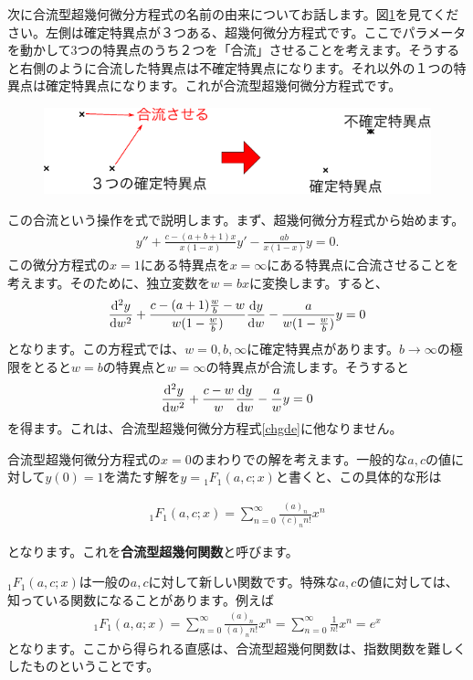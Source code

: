 \documentclass[report,paper=a4, fontsize=12pt, line_length=16cm, number_of_lines=33,dvipdfmx]{jlreq}
\newenvironment{important}{\begin{tcolorbox}[
  colback = white,
  colframe = red!35,
  boxrule = 2mm,
  fonttitle = \bfseries,
  after = \noindent] }{\end{tcolorbox}}
\numberwithin{equation}{section}
\newcommand{\strong}[1]{\textsf{\bfseries #1}}
\newcommand{\CH}{{}_1F_1}
\begin{document}
次に合流型超幾何微分方程式の名前の由来についてお話します。図\ref{fig:confluent}を見てください。左側は確定特異点が３つある、超幾何微分方程式です。ここでパラメータを動かして3つの特異点のうち２つを「合流」させることを考えます。そうすると右側のように合流した特異点は不確定特異点になります。それ以外の１つの特異点は確定特異点になります。これが合流型超幾何微分方程式です。
\begin{figure}[htbp]
  \centering
  \includegraphics{confluent.pdf}
  \caption{}
  \label{fig:confluent}
\end{figure}

この合流という操作を式で説明します。まず、超幾何微分方程式から始めます。
\begin{align}
  y''+\frac{c-(a+b+1)x}{x(1-x)}y'-\frac{ab}{x(1-x)}y=0.
\end{align}
この微分方程式の$x=1$にある特異点を$x=\infty$にある特異点に合流させることを考えます。そのために、独立変数を$w=bx$に変換します。すると、
\begin{align}
  \dv[2]{y}{w}+\frac{c-(a+1)\frac{w}{b}-w}{w(1-\frac{w}{b})}\dv{y}{w}-\frac{a}{w(1-\frac{w}{b})}y=0
\end{align}
となります。この方程式では、$w=0,b,\infty$に確定特異点があります。$b\to \infty$の極限をとると$w=b$の特異点と$w=\infty$の特異点が合流します。そうすると
\begin{align}
  \dv[2]{y}{w}+\frac{c-w}{w}\dv{y}{w}-\frac{a}{w}y=0
\end{align}
を得ます。これは、合流型超幾何微分方程式\eqref{chgde}に他なりません。

合流型超幾何微分方程式の$x=0$のまわりでの解を考えます。一般的な$a,c$の値に対して$y(0)=1$を満たす解を$y=\CH(a,c;x)$と書くと、この具体的な形は
\begin{important}
  \begin{align}
    \CH(a,c;x)=\sum_{n=0}^{\infty}\frac{(a)_n}{(c)_n n!}x^n
    \label{chgf}
  \end{align}    
\end{important}
となります。これを\strong{合流型超幾何関数}と呼びます。

$\CH(a,c;x)$は一般の$a,c$に対して新しい関数です。特殊な$a,c$の値に対しては、知っている関数になることがあります。例えば
\begin{align}
  \CH(a,a;x)=\sum_{n=0}^{\infty}\frac{(a)_n}{(a)_n n!}x^n
  =\sum_{n=0}^{\infty}\frac{1}{n!}x^n=e^x
\end{align}
となります。ここから得られる直感は、合流型超幾何関数は、指数関数を難しくしたものということです。
\end{document}

